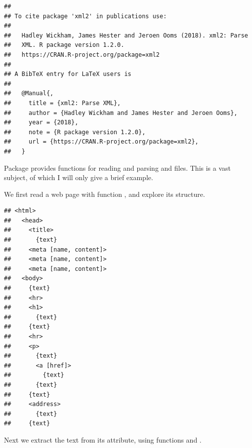 \documentclass[krantz2]{krantz}\usepackage{knitr}%
\begin{document}
\begin{knitrout}\footnotesize
{}\color{fgcolor}\begin{kframe}
\begin{alltt}
\hlstd{(} \hlstd{=} \hlstd{)}
\end{alltt}
\begin{verbatim}
## 
## To cite package 'xml2' in publications use:
## 
##   Hadley Wickham, James Hester and Jeroen Ooms (2018). xml2: Parse
##   XML. R package version 1.2.0.
##   https://CRAN.R-project.org/package=xml2
## 
## A BibTeX entry for LaTeX users is
## 
##   @Manual{,
##     title = {xml2: Parse XML},
##     author = {Hadley Wickham and James Hester and Jeroen Ooms},
##     year = {2018},
##     note = {R package version 1.2.0},
##     url = {https://CRAN.R-project.org/package=xml2},
##   }
\end{verbatim}
\end{kframe}
\end{knitrout}

Package  provides functions for reading and parsing  and  files. This is a vast subject, of which I will only give a brief example.

We first read a web page with function , and explore its structure.

\begin{knitrout}\footnotesize
{}\color{fgcolor}\begin{kframe}
\begin{alltt}
 \hlkwb{<-} \hlstd{(}\hlstd{)}
\end{alltt}
\begin{verbatim}
## <html>
##   <head>
##     <title>
##       {text}
##     <meta [name, content]>
##     <meta [name, content]>
##     <meta [name, content]>
##   <body>
##     {text}
##     <hr>
##     <h1>
##       {text}
##     {text}
##     <hr>
##     <p>
##       {text}
##       <a [href]>
##         {text}
##       {text}
##     {text}
##     <address>
##       {text}
##     {text}
\end{verbatim}
\end{kframe}
\end{knitrout}

Next we extract the text from its  attribute, using functions  and .
\end{document}
